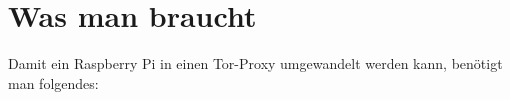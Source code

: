 \section{Was man braucht}
Damit ein Raspberry Pi in einen Tor-Proxy umgewandelt werden kann, benötigt man folgendes: 


